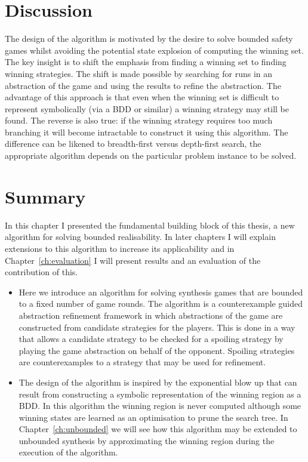 \section{Discussion}

The design of the algorithm is motivated by the desire to solve bounded safety games whilst avoiding the potential state explosion of computing the winning set. The key insight is to shift the emphasis from finding a winning set to finding winning strategies. The shift is made possible by searching for runs in an abstraction of the game and using the results to refine the abstraction. The advantage of this approach is that even when the winning set is difficult to represent symbolically (via a BDD or similar) a winning strategy may still be found. The reverse is also true: if the winning strategy requires too much branching it will become intractable to construct it using this algorithm. The difference can be likened to breadth-first versus depth-first search, the appropriate algorithm depends on the particular problem instance to be solved.

\section{Summary}

In this chapter I presented the fundamental building block of this thesis, a new algorithm for solving bounded realisability. In later chapters I will explain extensions to this algorithm to increase its applicability and in Chapter~\ref{ch:evaluation} I will present results and an evaluation of the contribution of this.

\begin{itemize}
    \item Here we introduce an algorithm for solving synthesis games that are bounded to a fixed number of game rounds. The algorithm is a counterexample guided abstraction refinement framework in which abstractions of the game are constructed from candidate strategies for the players. This is done in a way that allows a candidate strategy to be checked for a spoiling strategy by playing the game abstraction on behalf of the opponent. Spoiling strategies are counterexamples to a strategy that may be used for refinement.

    \item The design of the algorithm is inspired by the exponential blow up that can result from constructing a symbolic representation of the winning region as a BDD. In this algorithm the winning region is never computed although some winning states are learned as an optimisation to prune the search tree. In Chapter~\ref{ch:unbounded} we will see how this algorithm may be extended to unbounded synthesis by approximating the winning region during the execution of the algorithm.

\end{itemize}


